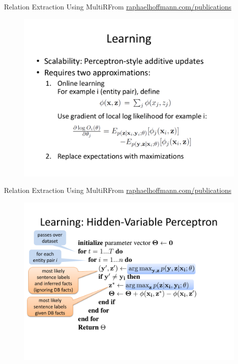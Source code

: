 \documentclass{beamer}
\begin{document}
\begin{frame}{Relation Extraction Using MultiR}{From \url{raphaelhoffmann.com/publications}}
\begin{figure}[h]
 \centering
 \includegraphics[scale=0.40]{./imgs/multirmode7.pdf}
 \end{figure}
\end{frame}
\begin{frame}{Relation Extraction Using MultiR}{From \url{raphaelhoffmann.com/publications}}
\begin{figure}[h]
 \centering
 \includegraphics[scale=0.40]{./imgs/multirmode8.pdf}
 \end{figure}
\end{frame}
\end{document}
